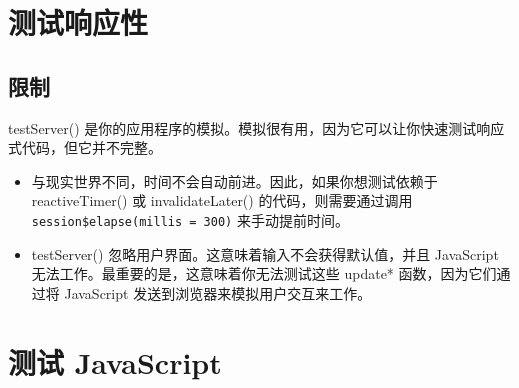 \section{测试响应性}
\subsection{限制}
testServer() 是你的应用程序的模拟。模拟很有用，因为它可以让你快速测试响应式代码，但它并不完整。
\begin{itemize}
    \item  与现实世界不同，时间不会自动前进。因此，如果你想测试依赖于 reactiveTimer() 或 invalidateLater() 的代码，则需要通过调用 \verb|session$elapse(millis = 300)| 来手动提前时间。

    \item testServer() 忽略用户界面。这意味着输入不会获得默认值，并且 JavaScript 无法工作。最重要的是，这意味着你无法测试这些 update* 函数，因为它们通过将 JavaScript 发送到浏览器来模拟用户交互来工作。
\end{itemize}
\section{测试 JavaScript}
